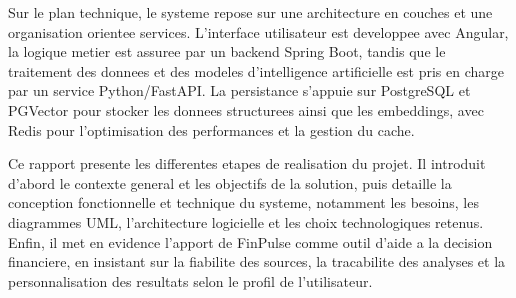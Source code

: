Sur le plan technique, le systeme repose sur une architecture en couches et une
organisation orientee services. L'interface utilisateur est developpee avec Angular,
la logique metier est assuree par un backend Spring Boot, tandis que le traitement des
donnees et des modeles d'intelligence artificielle est pris en charge par un service
Python/FastAPI. La persistance s'appuie sur PostgreSQL et PGVector pour stocker les
donnees structurees ainsi que les embeddings, avec Redis pour l'optimisation des
performances et la gestion du cache.

Ce rapport presente les differentes etapes de realisation du projet. Il introduit
d'abord le contexte general et les objectifs de la solution, puis detaille la
conception fonctionnelle et technique du systeme, notamment les besoins, les
diagrammes UML, l'architecture logicielle et les choix technologiques retenus. Enfin,
il met en evidence l'apport de FinPulse comme outil d'aide a la decision financiere,
en insistant sur la fiabilite des sources, la tracabilite des analyses et la
personnalisation des resultats selon le profil de l'utilisateur.
